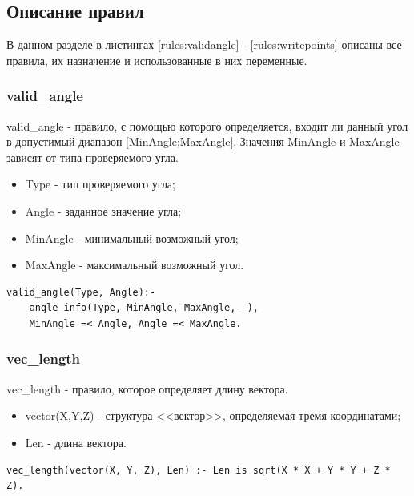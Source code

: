 \newpage

\subsection{Описание правил}
\hspace{0.6cm} В данном разделе в листингах \ref{rules:validangle} - \ref{rules:writepoints} описаны все правила, их назначение и использованные в них переменные.

\subsubsection{valid\_angle}
\hspace{0.6cm} valid\_angle - правило, с помощью которого определяется, входит ли данный угол в допустимый диапазон [MinAngle;MaxAngle]. Значения MinAngle и MaxAngle зависят от типа проверяемого угла.

\begin{itemize}
	\item Type - тип проверяемого угла;
	\item Angle - заданное значение угла;
	\item MinAngle - минимальный возможный угол;
	\item MaxAngle - максимальный возможный угол.
\end{itemize}

\begin{lstlisting}[caption=Реализация правила valid\_angle, label=rules:validangle]
valid_angle(Type, Angle):-
	angle_info(Type, MinAngle, MaxAngle, _),
	MinAngle =< Angle, Angle =< MaxAngle.
\end{lstlisting}


\subsubsection{vec\_length}
\hspace{0.6cm} vec\_length - правило, которое определяет длину вектора.

\begin{itemize}
	\item vector(X,Y,Z) - структура <<вектор>>, определяемая тремя координатами;
	\item Len - длина вектора.
\end{itemize}

\begin{lstlisting}[caption=Реализация правила vec\_length, label=rules:veclength]
vec_length(vector(X, Y, Z), Len) :- Len is sqrt(X * X + Y * Y + Z * Z).
\end{lstlisting}

